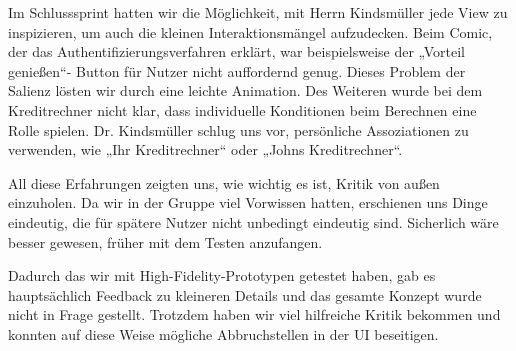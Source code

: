 	Im Schlusssprint hatten wir die Möglichkeit, mit Herrn Kindsmüller jede View zu inspizieren, um auch die kleinen Interaktionsmängel aufzudecken. Beim Comic, der das Authentifizierungsverfahren erklärt, war beispielsweise der „Vorteil genießen“- Button für Nutzer nicht auffordernd genug. Dieses Problem der Salienz lösten wir durch eine leichte Animation. Des Weiteren wurde bei dem Kreditrechner nicht klar, dass individuelle Konditionen beim Berechnen eine Rolle spielen. Dr. Kindsmüller schlug uns vor, persönliche Assoziationen zu verwenden, wie „Ihr  Kreditrechner“ oder „Johns Kreditrechner“.

	All diese Erfahrungen zeigten uns, wie wichtig es ist, Kritik von außen einzuholen. Da wir in der Gruppe viel Vorwissen hatten, erschienen uns Dinge eindeutig, die für spätere Nutzer nicht unbedingt eindeutig sind.
Sicherlich wäre besser gewesen, früher mit dem Testen anzufangen.

	Dadurch das wir mit High-Fidelity-Prototypen getestet haben, gab es hauptsächlich Feedback zu kleineren Details und das gesamte Konzept wurde nicht in Frage gestellt. Trotzdem haben wir viel hilfreiche Kritik bekommen und konnten auf diese Weise mögliche Abbruchstellen in der UI beseitigen.
